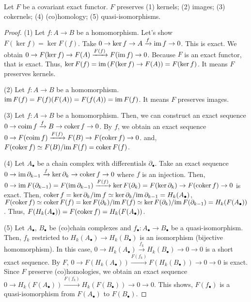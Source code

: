 \begin{lemma}
  Let \(F\) be a covariant exact functor.
  \(F\) preserves (1) kernels; (2) images; (3) cokernels; (4) (co)homology; (5) quasi-isomorphisms.
\end{lemma}
\begin{proof}
  (1)
  Let \(f: A \to B\) be a homomorphism.
  Let's show \(F(\ker f) = \ker F(f)\).
  Take \(0 \to \ker f \to A \xrightarrow{f} \textnormal{im}\, f \to 0\).
  This is exact.
  We obtain \(0 \to F(\ker f) \to F(A) \xrightarrow{F(f)} F(\textnormal{im}\, f) \to 0\).
  Because \(F\) is an exact functor,
  that is exact.
  Thus, \(\ker F(f) = \textnormal{im}\, (F(\ker f) \to F(A)) = F(\ker f)\).
  It means \(F\) preserves kernels.

  (2)
  Let \(f: A \to B\) be a homomorphism.
  \(\textnormal{im}\, F(f) = F(f)(F(A)) = F(f(A)) = \textnormal{im}\, F(f)\).
  It means \(F\) preserves images.

  (3)
  Let \(f: A \to B\) be a homomorphism.
  Then, we can construct an exact sequence
  \(0 \to \textnormal{coim}\, f \xrightarrow{f} B \to \textnormal{coker}\, f \to 0\).
  By \(f\), we obtain an exact sequence
  \(0 \to F(\textnormal{coim}\, f) \xrightarrow{F(f)} F(B) \to F(\textnormal{coker}\, f) \to 0\).
  and,
  \(F(\textnormal{coker}\, f) \simeq F(B) / \textnormal{im}\, F(f) = \textnormal{coker}\, F(f)\).

  (4)
  Let \(A_\bullet\) be a chain complex with differentials \(\partial_\bullet\).
  Take an exact sequence
  \(0 \to \textnormal{im}\,\partial_{k - 1} \xrightarrow{f} \ker\partial_k \to \textnormal{coker}\, f \to 0\) where \(f\) is an injection.
  Then,
  \(0 \to \textnormal{im}\, F(\partial_{k - 1}) = F(\textnormal{im}\,\partial_{k - 1}) \xrightarrow{F(f)} \ker F(\partial_k) = F(\ker\partial_k) \to F(\textnormal{coker}\, f) \to 0\) is exact.
  Then,
  \(\textnormal{coker}\, f = \ker\partial_k / \textnormal{im}\, f \simeq \ker\partial_k / \textnormal{im}\, \partial_{k - 1} = H_k(A_\bullet)\),
  \(F(\textnormal{coker}\, f) \simeq \textnormal{coker}\, F(f) = \ker F(\partial_k) / \textnormal{im}\, F(f) \simeq \ker F(\partial_k) / \textnormal{im}\, F(\partial_{k - 1}) = H_k(F(A_\bullet))\).
  Thus, \(F(H_k(A_\bullet)) = F(\textnormal{coker}\, f) = H_k(F(A_\bullet))\).

  (5)
  Let \(A_\bullet\), \(B_\bullet\) be (co)chain complexes and \(f_\bullet: A_\bullet \to B_\bullet\) be a quasi-isomorphism.
  Then, \(f_k\) restricted to \(H_k(A_\bullet) \to H_k(B_\bullet)\) is an isomorphism (bijective homomorphism).
  In this case, \(0 \to H_k(A_\bullet) \xrightarrow{f_k} H_k(B_\bullet) \to 0 \to 0\) is a short exact sequence.
  By \(F\),
  \(0 \to F(H_k(A_\bullet)) \xrightarrow{F(f_k)} F(H_k(B_\bullet)) \to 0 \to 0\)
  is exact.
  Since \(F\) preserve (co)homologies, we obtain an exact sequence
  \(0 \to H_k(F(A_\bullet)) \xrightarrow{F(f_k)} H_k(F(B_\bullet)) \to 0 \to 0\).
  This shows, \(F(f_\bullet)\) is a quasi-isomorphism from \(F(A_\bullet)\) to \(F(B_\bullet)\).
\end{proof}

